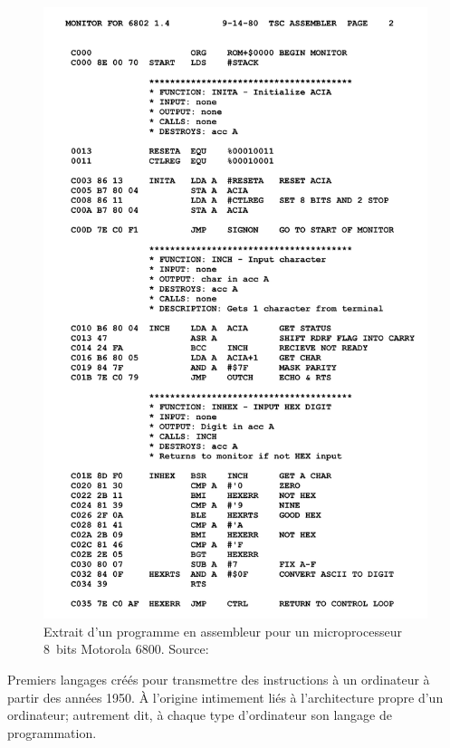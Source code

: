 \begin{figure}
  \centering
  \includegraphics[trim=0 475 0 0, clip=true]{Motorola_6800_Assembly_Language.png}
  \caption[Programme assembleur pour un microprocesseur 8~bits
  Motorola 6800.]{Extrait d'un programme en assembleur pour un
    microprocesseur 8~bits Motorola 6800. Source:
    }
  \label{fig:informatique:assembleur}
\end{figure}

Premiers langages créés pour transmettre des instructions à un
ordinateur à partir des années 1950. À l'origine intimement liés à
l'architecture propre d'un ordinateur; autrement dit, à chaque type
d'ordinateur son langage de programmation.

